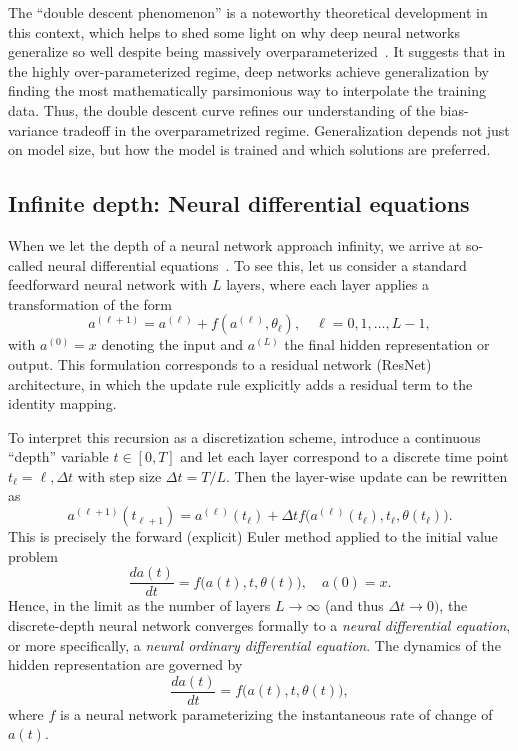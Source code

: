 The ``double descent phenomenon'' is a noteworthy theoretical development in this context, which helps to shed some light on why deep neural networks generalize so well despite being massively overparameterized~\cite{belkin2019reconciling}.
It suggests that in the highly over-parameterized regime, deep networks achieve generalization by finding the most mathematically parsimonious way to interpolate the training data. Thus, the double descent curve refines our understanding of the bias-variance tradeoff in the overparametrized regime. Generalization depends not just on model size, but how the model is trained and which solutions are preferred.



\subsection{Infinite depth: Neural differential equations}

When we let the depth of a neural network approach infinity, we arrive at so-called 
neural differential equations~\cite{chen2018neural}. To see this, let us consider a standard feedforward neural network with $L$ layers, where each layer applies a transformation of the form
$$
a^{(\ell+1)} = a^{(\ell)} + f(a^{(\ell)}, \theta_{\ell}), \quad \ell = 0, 1, \dots, L-1,
$$
with $a^{(0)} = x$ denoting the input and 
$a^{(L)}$ the final hidden representation or output. This formulation corresponds to a residual network (ResNet) architecture, in which the update rule explicitly adds a residual term to the identity mapping.

To interpret this recursion as a discretization scheme, introduce a continuous ``depth'' variable $t \in [0, T]$ and let each layer correspond to a discrete time point $t_\ell = \ell,\Delta t$ with step size $\Delta t = T/L$. Then the layer-wise update can be rewritten as
$$
a^{(\ell+1)}(t_{\ell+1}) = a^{(\ell)}(t_\ell) + \Delta t  f\big(a^{(\ell)}(t_\ell), t_\ell, \theta(t_\ell)\big).
$$
This is precisely the forward (explicit) Euler method applied to the initial value problem
$$
\frac{da(t)}{dt} = f\big(a(t), t, \theta(t)\big), \quad a(0) = x.
$$
Hence, in the limit as the number of layers $L \to \infty$ (and thus $\Delta t \to 0)$, the discrete-depth neural network converges formally to a {\em neural differential equation}, or more specifically, a {\em neural ordinary differential equation}. The dynamics of the hidden representation are governed by
$$
\frac{da(t)}{dt} = f\big(a(t), t, \theta(t)\big),
$$
where $f$ is a neural network parameterizing the instantaneous rate of change of $a(t)$.

